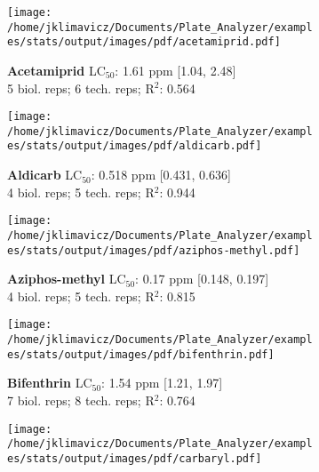 \documentclass{article}
\begin{document}
\begin{figure}[thp!]
   \begin{subfigure}{0.500\textwidth}
      \centering
      \texttt{[image: /home/jklimavicz/Documents/Plate\_Analyzer/examples/stats/output/images/pdf/acetamiprid.pdf]}
      \vspace{-0.05cm}
      \caption*{\textbf{Acetamiprid} LC$_{50}$: 1.61 ppm [1.04, 2.48] \\ 
5 biol. reps; 6 tech. reps; R$^2$: 0.564}
      \vspace{0.1cm}
   \end{subfigure}%
   \begin{subfigure}{0.500\textwidth}
      \centering
      \texttt{[image: /home/jklimavicz/Documents/Plate\_Analyzer/examples/stats/output/images/pdf/aldicarb.pdf]}
      \vspace{-0.05cm}
      \caption*{\textbf{Aldicarb} LC$_{50}$: 0.518 ppm [0.431, 0.636] \\ 
4 biol. reps; 5 tech. reps; R$^2$: 0.944}
      \vspace{0.1cm}
   \end{subfigure}%
\vspace{-0.1cm}
   \begin{subfigure}{0.500\textwidth}
      \centering
      \texttt{[image: /home/jklimavicz/Documents/Plate\_Analyzer/examples/stats/output/images/pdf/aziphos-methyl.pdf]}
      \vspace{-0.05cm}
      \caption*{\textbf{Aziphos-methyl} LC$_{50}$: 0.17 ppm [0.148, 0.197] \\ 
4 biol. reps; 5 tech. reps; R$^2$: 0.815}
      \vspace{0.1cm}
   \end{subfigure}%
   \begin{subfigure}{0.500\textwidth}
      \centering
      \texttt{[image: /home/jklimavicz/Documents/Plate\_Analyzer/examples/stats/output/images/pdf/bifenthrin.pdf]}
      \vspace{-0.05cm}
      \caption*{\textbf{Bifenthrin} LC$_{50}$: 1.54 ppm [1.21, 1.97] \\ 
7 biol. reps; 8 tech. reps; R$^2$: 0.764}
      \vspace{0.1cm}
   \end{subfigure}%
\vspace{-0.1cm}
   \begin{subfigure}{0.500\textwidth}
      \centering
      \texttt{[image: /home/jklimavicz/Documents/Plate\_Analyzer/examples/stats/output/images/pdf/carbaryl.pdf]}

\end{subfigure}
\end{figure}
\end{document}
